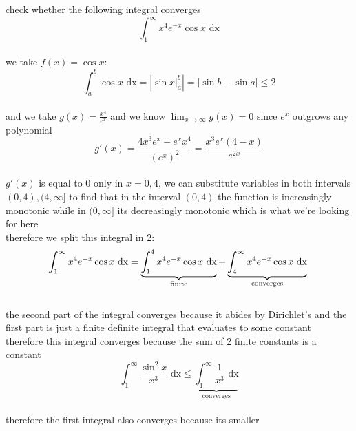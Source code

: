 \documentclass[a4paper,12pt]{article}
\newcommand{\?}{\stackrel{?}{=}}
\begin{document}
\begin{definition}
\begin{my_example}
check whether the following integral converges\\[0pt]
\[
  \int_1^\infty x^4e^{-x} \cos x \text{ dx}
\]\\[0pt]
we take \(f(x) = \cos x\):\\[0pt]
\[
  \int_a^b \cos x \text{ dx} = \left|\sin x\big|_a^b\right| = \left|\sin b - \sin a\right| \leq 2
\]\\[0pt]
and we take \(g(x) = \frac{x^4}{e^x}\) and we know \(\lim_{x\to\infty} g(x) = 0\) since \(e^x\) outgrows any polynomial\\[0pt]
\[
  g'(x) = \frac{4x^3e^x-e^xx^4}{{(e^x)}^2} = \frac{x^3e^x(4-x)}{e^{2x}}
\]\\[0pt]
\(g'(x)\) is equal to 0 only in \(x=0,4\), we can substitute variables in both intervals \((0,4),(4,\infty]\) to find that in the interval \((0,4)\) the function is increasingly monotonic while in \((0,\infty]\) its decreasingly monotonic which is what we're looking for here\\[0pt]
therefore we split this integral in 2:\\[0pt]
\[
  \int_1^\infty x^4e^{-x} \cos x \text{ dx} = \underbrace{\int_1^4 x^4e^{-x}\cos x \text{ dx}}_{\text{finite}} + \underbrace{\int_4^\infty x^4e^{-x}\cos x \text{ dx}}_{\text{converges}}\\
\]\\[0pt]
the second part of the integral converges because it abides by Dirichlet's and the first part is just a finite definite integral that evaluates to some constant\\[0pt]
therefore this integral converges because the sum of 2 finite constants is a constant\\[0pt]
\[
 \int_1^\infty \frac{\sin^2 x}{x^3} \text{ dx} \leq \underbrace{\int_1^\infty \frac{1}{x^3} \text{ dx}}_{\text{converges}}
\]\\[0pt]
therefore the first integral also converges because its smaller\\[0pt]
\end{my_example}


\end{definition}
\end{document}
